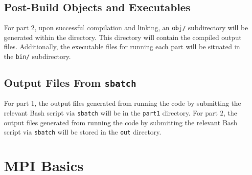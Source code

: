 \documentclass{article}
\begin{document}
\subsection{Post-Build Objects and Executables}
For part 2, upon successful compilation and linking, an \texttt{obj/} subdirectory will be generated within the directory. 
This directory will contain the compiled output files. Additionally, the executable files for running each part will be 
situated in the \texttt{bin/} subdirectory.

\subsection{Output Files From \texttt{sbatch}}
For part 1, the output files generated from running the code by submitting the relevant Bash script via \texttt{sbatch} will be 
in the \texttt{part1} directory. 
For part 2, the output files generated from running the code by submitting the relevant Bash script via \texttt{sbatch} will be 
stored in the \texttt{out} directory. 

\section{MPI Basics}
\end{document}
